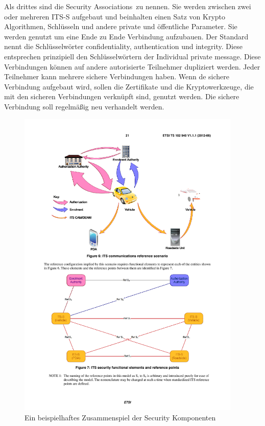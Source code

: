 Als drittes sind die \glqq Security Associations\grqq~zu nennen. Sie werden zwischen zwei oder mehreren \ac{ITS-S} aufgebaut und beinhalten einen Satz von Krypto Algorithmen, Schlüs\-seln und andere private und öffentliche Parameter. Sie werden genutzt um eine Ende zu Ende Verbindung aufzubauen.  Der Standard nennt die Schlüsselwörter confidentiality, authentication und integrity.  Diese entsprechen prinzipiell den Schlüsselwörtern der \glqq    Individual private message\grqq. Diese Verbindungen können auf andere autorisierte Teilnehmer dupliziert werden. Jeder Teilnehmer kann mehrere sichere Verbindungen haben. Wenn de sichere Verbindung aufgebaut wird, sollen die Zertifikate und die Kryptowerkzeuge, die mit den sicheren Verbindungen verknüpft sind, genutzt werden. Die sichere Verbindung soll regelmäßig neu verhandelt werden. 

\begin{figure}[h]
	\includegraphics[width=0.95\textwidth]{content/images/02_architektur/enrolementScenario-ts102_940.pdf}
	\caption{Ein beispielhaftes Zusammenspiel der Security Komponenten \cite{ts102940}}
	\label{fig:architektur_enrolementBeispielSzenario}
\end{figure}

